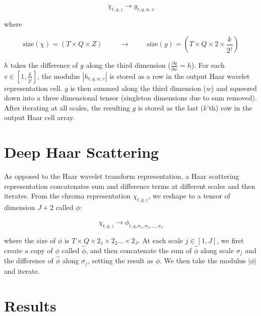 \documentclass{article}
\begin{document}
	\begin{equation}
	\chi_{t,q,z} \rightarrow g_{t,q,w,v}
	\end{equation}
	
	where
	
	\begin{equation}
	\mathrm{size}(\chi) = (T \times Q \times Z) \hspace{1cm} \rightarrow \hspace{1cm}  \mathrm{size}(g) = (T \times Q \times 2 \times \frac{k}{2^j})
	\end{equation}
	
	$h$ takes the difference of $g$ along the third dimension ($\frac{\partial g}{\partial w} = h$). For each $v \in [1, \frac{k}{2^j}]$, the modulus $| h_{t,q,w,v}|$ is stored as a row in the output Haar wavelet representation cell. $g$ is then summed along the third dimension ($w$) and squeezed down into a three dimensional tensor (singleton dimensions due to sum removed). After iterating at all scales, the resulting $g$ is stored as the last ($k$'th) row in the output Haar cell array.
	

\section{Deep Haar Scattering}\label{sec:scattering}

	As opposed to the Haar wavelet transform representation, a Haar scattering representation concatenates sum and difference terms at different scales and then iterates. From the chroma representation $\chi_{t,q,z}$, we reshape to a tensor of dimension $J+2$ called $\phi$:
	
	\begin {equation}
	\chi_{t,q,z} \rightarrow \phi_{t,q,\sigma_1, \sigma_2, \ldots , \sigma_J}
	\end{equation}
	
	where the size of $\phi$ is $T \times Q \times 2_1 \times 2_2 \ldots \times 2_J$. At each scale $j \in [1, J]$, we first create a copy of $\phi$ called $\hat{\phi}$, and then concatenate the sum of $\hat{\phi}$ along scale $\sigma_j$ and the difference of $\hat{\phi}$ along $\sigma_j$, setting the result as $\phi$. We then take the modulus $| \phi | $ and iterate. 
	

\section{Results}\label{sec:results}
\end{document}
